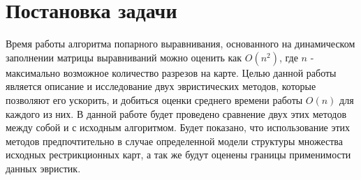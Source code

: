 \section{Постановка задачи}
Время работы алгоритма попарного выравнивания, основанного на динамическом заполнении матрицы выравниваний можно оценить как $O(n^2)$, где $n$ - максимально возможное количество разрезов на карте. Целью данной работы является описание и исследование двух эвристических методов, которые позволяют его ускорить, и добиться оценки среднего времени работы $O(n)$ для каждого из них. В данной работе будет проведено сравнение двух этих методов между собой и с исходным алгоритмом. Будет показано, что использование этих методов предпочтительно в случае определенной модели структуры множества исходных рестрикционных карт, а так же будут оценены границы применимости данных эвристик.

